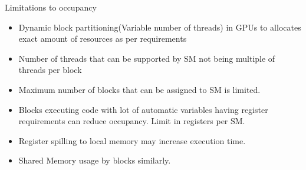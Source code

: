 \documentclass{beamer}
\begin{document}
\begin{frame}{Limitations to occupancy}
    \begin{itemize}
        \item Dynamic block partitioning(Variable number of threads) in GPUs to allocates exact amount of resources as per requirements
        \item Number of threads that can be supported by SM not being multiple of threads per block 
        \item Maximum number of blocks that can be assigned to SM is limited.
        \item Blocks executing code with lot of automatic variables having register requirements can reduce occupancy. Limit in registers per SM.
        \item Register spilling to local memory may increase execution time.
        \item Shared Memory usage by blocks similarly.
    \end{itemize}
\end{frame}
\end{document}
